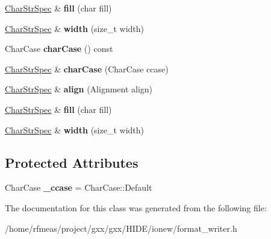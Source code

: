 \begin{DoxyCompactItemize}
\item 
\hyperlink{classgxx_1_1io_1_1CharStrSpec}{Char\+Str\+Spec} \& {\bfseries fill} (char fill)\hypertarget{classgxx_1_1io_1_1CharStrSpec_af54cb7ea3744f0551d59ae3b91c3969c}{}\label{classgxx_1_1io_1_1CharStrSpec_af54cb7ea3744f0551d59ae3b91c3969c}

\item 
\hyperlink{classgxx_1_1io_1_1CharStrSpec}{Char\+Str\+Spec} \& {\bfseries width} (size\+\_\+t width)\hypertarget{classgxx_1_1io_1_1CharStrSpec_a49603cb128afc1799f20fa7882e79f55}{}\label{classgxx_1_1io_1_1CharStrSpec_a49603cb128afc1799f20fa7882e79f55}

\item 
Char\+Case {\bfseries char\+Case} () const \hypertarget{classgxx_1_1io_1_1CharStrSpec_ab3b9dbaf9f770d9a154c6ec8a2594cfb}{}\label{classgxx_1_1io_1_1CharStrSpec_ab3b9dbaf9f770d9a154c6ec8a2594cfb}

\item 
\hyperlink{classgxx_1_1io_1_1CharStrSpec}{Char\+Str\+Spec} \& {\bfseries char\+Case} (Char\+Case ccase)\hypertarget{classgxx_1_1io_1_1CharStrSpec_a7ae04a1d41418f5a856bf5101b27f108}{}\label{classgxx_1_1io_1_1CharStrSpec_a7ae04a1d41418f5a856bf5101b27f108}

\item 
\hyperlink{classgxx_1_1io_1_1CharStrSpec}{Char\+Str\+Spec} \& {\bfseries align} (Alignment align)\hypertarget{classgxx_1_1io_1_1CharStrSpec_ab1c6966b305170da20e3742c64417cce}{}\label{classgxx_1_1io_1_1CharStrSpec_ab1c6966b305170da20e3742c64417cce}

\item 
\hyperlink{classgxx_1_1io_1_1CharStrSpec}{Char\+Str\+Spec} \& {\bfseries fill} (char fill)\hypertarget{classgxx_1_1io_1_1CharStrSpec_af54cb7ea3744f0551d59ae3b91c3969c}{}\label{classgxx_1_1io_1_1CharStrSpec_af54cb7ea3744f0551d59ae3b91c3969c}

\item 
\hyperlink{classgxx_1_1io_1_1CharStrSpec}{Char\+Str\+Spec} \& {\bfseries width} (size\+\_\+t width)\hypertarget{classgxx_1_1io_1_1CharStrSpec_a49603cb128afc1799f20fa7882e79f55}{}\label{classgxx_1_1io_1_1CharStrSpec_a49603cb128afc1799f20fa7882e79f55}

\end{DoxyCompactItemize}
\subsection*{Protected Attributes}
\begin{DoxyCompactItemize}
\item 
Char\+Case {\bfseries \+\_\+ccase} = Char\+Case\+::\+Default\hypertarget{classgxx_1_1io_1_1CharStrSpec_abeda9480c8b16d1c07bce613ca42be1e}{}\label{classgxx_1_1io_1_1CharStrSpec_abeda9480c8b16d1c07bce613ca42be1e}

\end{DoxyCompactItemize}


The documentation for this class was generated from the following file\+:\begin{DoxyCompactItemize}
\item 
/home/rfmeas/project/gxx/gxx/\+H\+I\+D\+E/ionew/format\+\_\+writer.\+h\end{DoxyCompactItemize}
